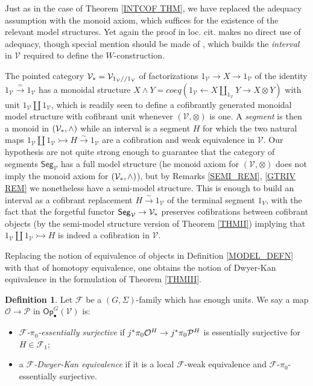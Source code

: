 \documentclass[a4paper,10pt
,draft
]{article}%
\numberwithin{equation}{section}
\numberwithin{figure}{section}
\theoremstyle{definition} %
\newtheorem{definition}[equation]{Definition}%
\newcommand{\Op}{\mathsf{Op}}%
\newcommand{\F}{\ensuremath{\mathcal F}}
\newcommand{\V}{\ensuremath{\mathcal V}}
\renewcommand{\O}{\ensuremath{\mathcal O}}
\renewcommand{\P}{\ensuremath{\mathcal P}}
\newcommand{\1}{\ensuremath{\mathbbm 1}}%
\begin{document}
Just as in the case of Theorem \ref{INTCOF THM},
we have replaced the adequacy assumption \cite[Defn 1.1]{BM13}
with the monoid axiom, which suffices for the existence of the relevant model structures. 
Yet again the proof in loc. cit. makes no direct use of adequacy, 
though special mention should be made of \cite[Lemma 2.23]{BM13}, 
which builds the \emph{interval} \cite[Defn. 4.1]{BM06} in $\V$
required to define the $W$-construction.

The pointed category $\V_{\**}=\V_{1_{\V}//1_{\V}}$
of factorizations
$1_{\V} \to X \to 1_{\V}$
of the identity
$1_{\V} \xrightarrow{=} 1_{\V}$
has a monoidal structure
$X \wedge Y  = coeq \left(1_{\V} \leftarrow X \amalg_{1_{\V}} Y \to X \otimes Y\right)$ with unit $1_{\V} \amalg 1_{\V}$,
which is readily seen to define a cofibrantly generated monoidal model structure with cofibrant unit whenever $(\V,\otimes)$ is one.
A \emph{segment} \cite[Defn 4.1]{BM06} is then a monoid
in $(\V_{\**},\wedge)$
while an interval is a segment $H$ for which the two natural maps
$1_{\V} \amalg 1_{\V} \rightarrowtail H \xrightarrow{\sim} 1_{\V}$
are a cofibration and weak equivalence in $\V$.
Our hypothesis are not quite strong enough 
to guarantee that the category of segments $\mathsf{Seg}_{\V}$
has a full model structure 
(he monoid axiom for $(\V,\otimes)$ does not imply the monoid axiom for $(\V_{\**},\wedge)$),
but by Remarks \ref{SEMI_REM}, \ref{GTRIV REM}
we nonetheless have a semi-model structure. This is enough to build an interval as a cofibrant replacement
$H \xrightarrow{\sim} 1_{\V}$
of the terminal segment $1_{V}$, with the fact that the forgetful functor
$\mathsf{Seg}_{\V} \to \V_{\**}$
preserves cofibrations between cofibrant objects 
(by the semi-model structure version of Theorem \ref{THMII})
implying that
$1_{\V} \amalg 1_{\V} \rightarrowtail H$
is indeed a cofibration in $\V$.


\vskip 10pt



Replacing the notion of equivalence of objects
in Definition \ref{MODEL_DEFN}
with that of homotopy equivalence, 
one obtains the notion of Dwyer-Kan equivalence
in the formulation of Theorem \ref{THMIII}.


\begin{definition}\label{DKEQUIV_DEF}
Let $\F$ be a $(G,\Sigma)$-family which has enough units.
We say a map $\O \to \P$ in $\Op^G_\bullet(\V)$ is:
\begin{itemize}
\item \textit{$\F$-$\pi_0$-essentially surjective} if
	$j^{\**}\pi_0 \O^H \to j^{\**}\pi_0 \P^H$
	is essentially surjective for $H \in \F_1$;
\item a \textit{$\F$-Dwyer-Kan equivalence} if
	it is a local $\F$-weak equivalence and $\F$-$\pi_0$-essentially
	surjective.
\end{itemize}
\end{definition}
\end{document}
